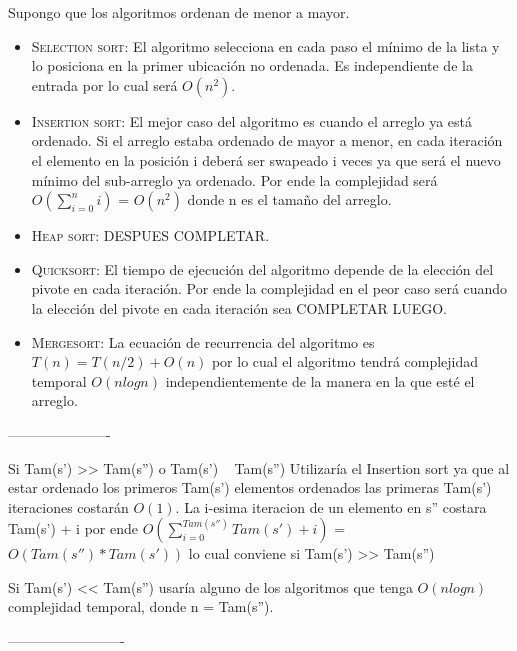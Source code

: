 
Supongo que los algoritmos ordenan de menor a mayor. 

\begin{itemize}
  \item \textsc{Selection sort}: El algoritmo selecciona en cada paso el mínimo de la lista y lo posiciona 
  en la primer ubicación no ordenada. Es independiente de la entrada por lo cual será $O(n^2)$.
  \item \textsc{Insertion sort}: El mejor caso del algoritmo es cuando el arreglo ya está ordenado. Si el 
  arreglo estaba ordenado de mayor a menor, en cada iteración el elemento en la posición i
  deberá ser swapeado i veces  ya que será el nuevo mínimo del sub-arreglo ya ordenado. Por ende la complejidad
  será $O(\sum\limits_{i=0}^{n}i)$ = $O(n^{2})$ donde n es el tamaño del arreglo.
  \item \textsc{Heap sort}: DESPUES COMPLETAR.
  \item \textsc{Quicksort}: El tiempo de ejecución del algoritmo depende de la elección del pivote en cada 
  iteración. Por ende la complejidad en el peor caso será cuando la elección del pivote en cada iteración sea 
  COMPLETAR LUEGO.
  \item \textsc{Mergesort}: La ecuación de recurrencia del algoritmo es $T(n) = T(n/2) + O(n)$ por lo cual 
  el algoritmo tendrá complejidad temporal $O(n log n)$ independientemente de la manera en la que esté el 
  arreglo.  
\end{itemize}

----------------------

Si Tam(s') >> Tam(s'') o Tam(s') ~ Tam(s'')
Utilizaría el Insertion sort ya que al estar ordenado los primeros Tam(s') elementos ordenados las primeras 
Tam(s') iteraciones costarán $O(1)$. La i-esima iteracion de un elemento en s'' costara Tam(s') + i
por ende $O(\sum\limits_{i=0}^{Tam(s'')}Tam(s')+ i)$ = $O(Tam(s'')*Tam(s'))$ lo cual conviene si Tam(s') >> Tam(s'')

Si Tam(s') << Tam(s'') usaría alguno de los algoritmos que tenga $O(n log n)$ complejidad temporal, donde 
n = Tam(s'').

-------------------------


